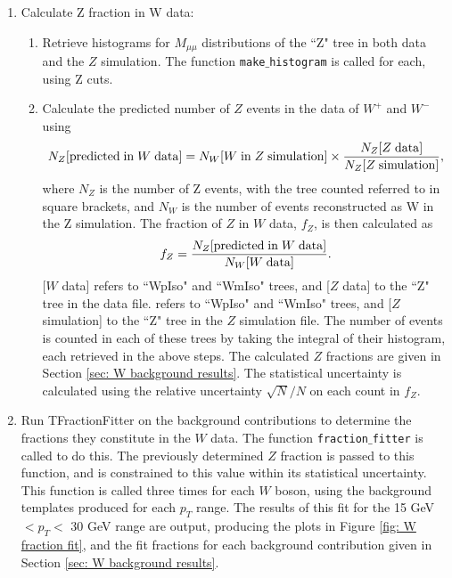 \documentclass[a4paper,12pt]{article}
\begin{document}
\begin{enumerate}
    \item Calculate Z fraction in W data:
    \begin{enumerate}
        \item Retrieve histograms for $M_{\mu\mu}$ distributions of the ``Z" tree in both data and the $Z$ simulation. The function \texttt{make$\_$histogram} is called for each, using Z cuts.
        \item Calculate the predicted number of $Z$ events in the data of $W^+$ and $W^-$ using
        \begin{equation}
            N_Z[{\rm predicted \; in \;} W {\rm\; data}] = N_W[W {\rm \; in \;} Z {\rm \; simulation}] \times \frac{N_Z[Z {\rm \; data}]}{N_Z[Z {\rm\; simulation}]},
        \end{equation}
        where $N_Z$ is the number of Z events, with the tree counted referred to in square brackets, and $N_W$ is the number of events reconstructed as W in the Z simulation. The fraction of $Z$ in $W$ data, $f_Z$, is then calculated as
        \begin{equation}
            f_Z = \frac{N_Z[{\rm predicted \; in \;} W {\rm\; data}]}{N_W[W {\rm \; data}]}.
        \end{equation}
        [$W$ data] refers to ``WpIso" and ``WmIso" trees, and [$Z$ data] to the ``Z" tree in the data file. \newline
        [$W$ in $Z$ simulation] refers to ``WpIso" and ``WmIso" trees, and [$Z$ simulation] to the ``Z" tree in the $Z$ simulation file. \newline 
        The number of events is counted in each of these trees by taking the integral of their histogram, each retrieved in the above steps. \newline
        The calculated $Z$ fractions are given in Section \ref{sec: W background results}.
        The statistical uncertainty is calculated using the relative uncertainty $\sqrt{N}/N$ on each count in $f_Z$.
    \end{enumerate}
    
    \item Run TFractionFitter on the background contributions to determine the fractions they constitute in the $W$ data. The function \texttt{fraction$\_$fitter} is called to do this. The previously determined $Z$ fraction is passed to this function, and is constrained to this value within its statistical uncertainty. This function is called three times for each $W$ boson, using the background templates produced for each $p_T$ range.\newline
    The results of this fit for the 15 GeV $< p_T <$ 30 GeV range are output, producing the plots in Figure \ref{fig: W fraction fit}, and the fit fractions for each background contribution given in Section \ref{sec: W background results}.
    

\end{enumerate}
\end{document}
